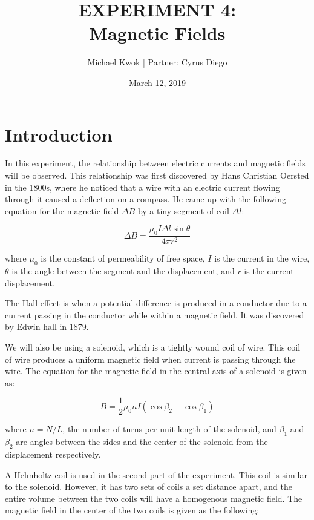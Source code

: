 \documentclass[12pt]{article}
\title{EXPERIMENT 4: \protect\\Magnetic Fields}
\date{March 12, 2019}
\author{Michael Kwok | Partner: Cyrus Diego }
\begin{document}
\maketitle
\pagebreak

\section{Introduction}
In this experiment, the relationship between electric currents and magnetic
fields will be observed. This relationship was first discovered by Hans
Christian Oersted in the 1800s, where he noticed that a wire with an electric
current flowing through it caused a deflection on a compass. He came up with the
following equation for the magnetic field $\Delta B$ by a tiny segment of coil $\Delta l$:

\begin{equation} \label{eq:deltaB}
    \Delta B = \frac{\mu_0I\Delta l \sin\theta}{4\pi r^2}
\end{equation}

where $\mu_0$ is the constant of permeability of free space, $I$ is the current
in the wire, $\theta$ is the angle between the segment and the displacement, and
$r$ is the current displacement.

The Hall effect is when a potential difference is produced in a conductor due to a
current passing in the conductor while within a magnetic field. It was discovered
by Edwin hall in 1879.

We will also be using a solenoid, which is a tightly wound coil of wire. This coil
of wire produces a uniform magnetic field when current is passing through the
wire. The equation for the magnetic field in the central axis of a solenoid is given as:

\begin{equation} \label{eq:B}
    B = \frac{1}{2}\mu_0nI(\cos\beta_2-\cos\beta_1)
\end{equation}

where $n = N/L$, the number of turns per unit length of the solenoid, and $\beta_1$
and $\beta_2$ are angles between the sides and the center of the solenoid from
the displacement respectively.

A Helmholtz coil is used in the second part of the experiment. This coil is similar
to the solenoid. However, it has two sets of coils a set distance apart, and the entire
volume between the two coils will have a homogenous magnetic field. The magnetic field
in the center of the two coils is given as the following:
\end{document}
